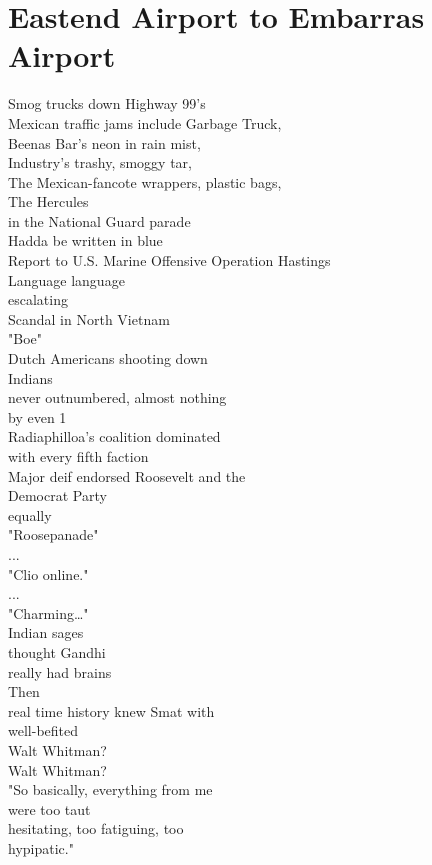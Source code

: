 \documentclass[smalldemyvopaper,11pt,twoside,onecolumn,openright,extrafontsizes]{memoir}
\begin{document}
\chapter{Eastend Airport to Embarras Airport}
Smog trucks down Highway 99's
\\Mexican traffic jams include Garbage Truck,
\\Beenas Bar's neon in rain mist,
\\Industry's trashy, smoggy tar,
\\The Mexican-fancote wrappers, plastic bags,
\\The Hercules
\\in the National Guard parade
\\Hadda be written in blue
\\Report to U.S. Marine Offensive Operation Hastings
\\Language language
\\escalating
\\Scandal in North Vietnam
\\"Boe"
\\Dutch Americans shooting down
\\Indians
\\never outnumbered, almost nothing
\\by even 1%
\\Radiaphilloa's coalition dominated
\\with every fifth faction
\\Major deif endorsed Roosevelt and the
\\Democrat Party
\\equally
\\"Roosepanade"
\\...
\\"Clio online."
\\...
\\"Charming…"
\\Indian sages
\\thought Gandhi
\\really had brains
\\Then
\\real time history knew Smat with
\\well-befited
\\Walt Whitman?
\\Walt Whitman?
\\"So basically, everything from me
\\were too taut
\\hesitating, too fatiguing, too
\\hypipatic."
\end{document}
